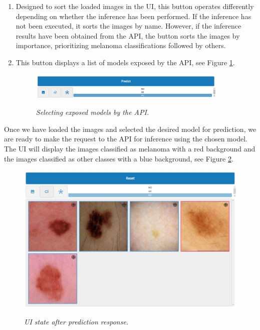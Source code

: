 \begin{enumerate}
  \item Designed to sort the loaded images in the UI, this button operates
    differently depending on whether the inference has been performed. If the
    inference has not been executed, it sorts the images by name. However, if
    the inference results have been obtained from the API, the button sorts the
    images by importance, prioritizing melanoma classifications followed by
    others.

  \item This button displays a list of models exposed by the API, see Figure
    \ref{fig:selecting-model}.


    \begin{figure}[H]
  \centering
  \includegraphics[width=0.9\textwidth]{imatges/results/selecting-model.png}
  \caption[Selecting exposed models by the API]{\textit{Selecting exposed models by the API. }}
  {\label{fig:selecting-model}}
\end{figure}

\end{enumerate}

Once we have loaded the images and selected the desired model for prediction,
we are ready to make the request to the API for inference using the chosen
model. The UI will display the images classified as melanoma with a red
background and the images classified as other classes with a blue background,
see Figure \ref{fig:after-prediction}.

\begin{figure}[H]
  \centering
  \begin{adjustbox}{width=0.9\textwidth, trim={0cm 3.55cm 0cm 0cm}, clip}
    \includegraphics[width=\textwidth]{imatges/results/after-prediction.png}
  \end{adjustbox}
  \caption[UI state after prediction response]{\textit{UI state after prediction response.}}
  {\label{fig:after-prediction}}
\end{figure}


